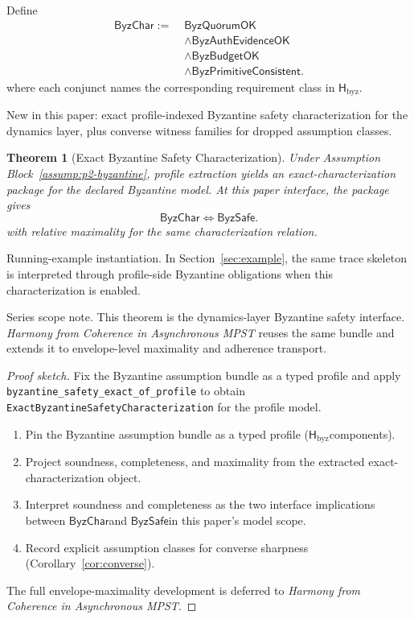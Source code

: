 \documentclass[a4paper,10pt,twocolumn,english]{article}
\numberwithin{equation}{section}
\theoremstyle{paperdef}
\theoremstyle{paperplain}
\newtheorem{theorem}[definition]{Theorem}
\theoremstyle{paperdef}
\theoremstyle{paperremark}
\newcommand{\Hbyz}{\ensuremath{\mathsf{H}_{\mathrm{byz}}}}
\newcommand{\ByzSafe}{\ensuremath{\mathsf{ByzSafe}}}
\newcommand{\ByzChar}{\ensuremath{\mathsf{ByzChar}}}
\begin{document}
Define
\begin{equation}
	\begin{aligned}
		\ByzChar :=\; & \mathsf{ByzQuorumOK}                   \\
		              & \land \mathsf{ByzAuthEvidenceOK}       \\
		              & \land \mathsf{ByzBudgetOK}             \\
		              & \land \mathsf{ByzPrimitiveConsistent}.
	\end{aligned}
\end{equation}
where each conjunct names the corresponding requirement class in \Hbyz.

New in this paper: exact profile-indexed Byzantine safety characterization for
the dynamics layer, plus converse witness families for dropped assumption
classes.

\begin{theorem}[Exact Byzantine Safety Characterization]
	\label{thm:byzantine}
	Under Assumption Block~\ref{assump:p2-byzantine}, profile extraction yields an exact-characterization package for the declared Byzantine model. At this paper interface, the package gives
	\begin{equation}
		\ByzChar \iff \ByzSafe.
	\end{equation}
	with relative maximality for the same characterization relation.
\end{theorem}

Running-example instantiation. In Section~\ref{sec:example}, the same trace
skeleton is interpreted through profile-side Byzantine obligations when this
characterization is enabled.

Series scope note. This theorem is the dynamics-layer Byzantine safety interface. \emph{Harmony from Coherence in Asynchronous MPST} reuses the same bundle and extends it to envelope-level maximality and adherence transport.

\begin{proof}[Proof sketch]
	Fix the Byzantine assumption bundle as a typed profile and apply \nolinkurl{byzantine_safety_exact_of_profile} to obtain \texttt{ExactByzantineSafetyCharacterization} for the profile model.

	\begin{enumerate}
		\item Pin the Byzantine assumption bundle as a typed profile (\Hbyz components).
		\item Project soundness, completeness, and maximality from the extracted exact-characterization object.
		\item Interpret soundness and completeness as the two interface implications between \ByzChar and \ByzSafe in this paper's model scope.
		\item Record explicit assumption classes for converse sharpness (Corollary~\ref{cor:converse}).
	\end{enumerate}

	The full envelope-maximality development is deferred to \emph{Harmony from Coherence in Asynchronous MPST}.
\end{proof}
\end{document}
